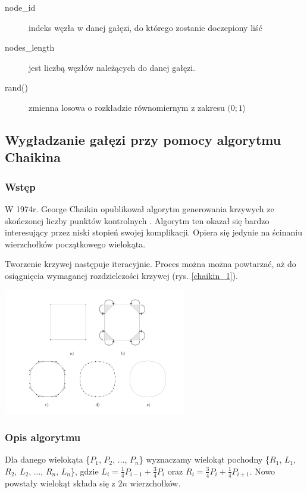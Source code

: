 \begin{description}
	\item[node\_id] indeks węzła w danej gałęzi, do którego zostanie doczepiony liść
	\item[nodes\_length] jest liczbą węzłów należących do danej gałęzi.
	\item[rand()] zmienna losowa o rozkładzie równomiernym z zakresu $(0;1\rangle$
\end{description}

\subsection{Wygładzanie gałęzi przy pomocy algorytmu Chaikina}
\subsubsection{Wstęp}
W 1974r. George Chaikin opublikował algorytm generowania krzywych ze skończonej liczby punktów kontrolnych \cite{smoothing}. Algorytm ten okazał się bardzo interesujący przez niski stopień swojej komplikacji. Opiera się jedynie na ścinaniu wierzchołków początkowego wielokąta.

Tworzenie krzywej następuje iteracyjnie. Proces można można powtarzać, aż do osiągnięcia wymaganej rozdzielczości krzywej (rys. \ref{chaikin_1}).

\begin{center}
	\includegraphics[width=80mm]{images/model/chaikin_1.png}
	\label{chaikin_1}
\end{center}

\subsubsection{Opis algorytmu}

Dla danego wielokąta \{$P_1$, $P_2$, ..., $P_n$\} wyznaczamy wielokąt pochodny \{$R_1$, $L_1$, $R_2$, $L_2$, ..., $R_n$, $L_n$\}, gdzie
$L_i = \frac{1}{4}P_{i-1} + \frac{3}{4}P_i$ oraz $R_i = \frac{3}{4}P_i + \frac{1}{4}P_{i+1}$.
Nowo powstały wielokąt składa się z $2n$ wierzchołków.


